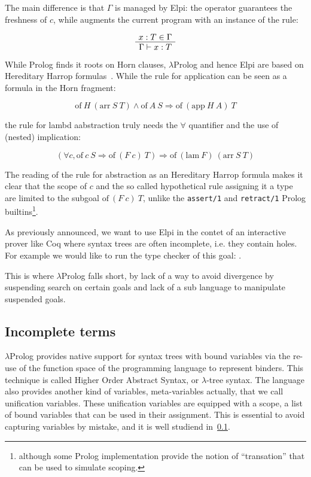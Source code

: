 \documentclass[a4paper, 11pt]{book}
\newenvironment{bprooftree}
  {\leavevmode\hbox\bgroup}
  {\DisplayProof\egroup}
\begin{document}
The main difference is that $\Gamma$ is managed by Elpi: the 
operator guarantees the freshness of $c$, while \elpiinline{=>} augments
the current program with an instance of the rule:

$$
\begin{bprooftree}
  \AxiomC{$x : T \in \Gamma$}
  \UnaryInfC{$\Gamma \vdash x : T$}
\end{bprooftree}
$$

While Prolog finds it roots on Horn clauses, $\lambda$Prolog and hence
Elpi are based on Hereditary Harrop formulas~\cite{}. While the rule for application
can be seen as a formula in the Horn fragment:

$$
\mathrm{of}~ H~(\mathrm{arr}~S~T) \land \mathrm{of}~A~S \Rightarrow \mathrm{of}~(\mathrm{app}~H~A)~T
$$

\noindent the rule for lambd aabstraction truly needs the $\forall$ quantifier
and the use of (nested) implication:

$$
(\forall c, \mathrm{of}~c~S \Rightarrow  \mathrm{of}~(F~c)~T) \Rightarrow \mathrm{of}~(\mathrm{lam}~F)~(\mathrm{arr}~S~T)
$$

The reading of the rule for abstraction as an Hereditary Harrop formula
makes it clear that the scope of $c$ and the so called hypothetical rule
assigning it a type are limited to the subgoal $\mathrm{of}~(F~c)~T$,
unlike the \texttt{assert/1} and \texttt{retract/1} Prolog builtins\footnote{
  although some Prolog implementation provide the notion of ``transation''
that can be used to simulate scoping.}.

As previously announced, we want to use Elpi in the contet of an
interactive prover like Coq where syntax trees are often incomplete, i.e.
they contain holes. For example we would like to run the
type checker of this goal: .

This is where $\lambda$Prolog falls short, by lack of a way to avoid
divergence by suspending search on certain goals and lack of a sub language
to manipulate suspended goals.


\subsection{Incomplete terms}

$\lambda$Prolog provides native support for syntax trees with bound
variables via the re-use of the function space of the programming language
to represent binders. This technique is called Higher Order Abstract Syntax,
or $\lambda$-tree syntax. The language also provides another kind
of variables, meta-variables actually, that we call unification variables.
These unification variables are equipped with a scope, a list of bound
variables that can be used in their assignment. This is essential to
avoid capturing variables by mistake, and it is well studiend in~\ref{}.
\end{document}
